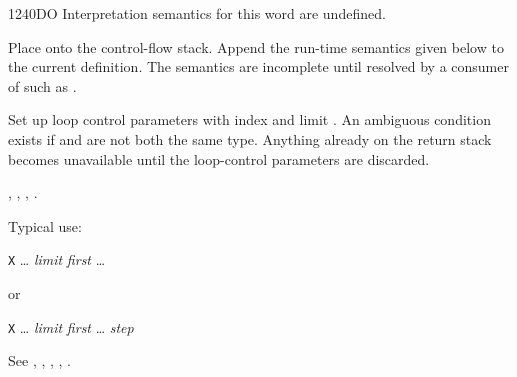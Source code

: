 \begin{worddef}{1240}{DO}
\interpret
	Interpretation semantics for this word are undefined.

\compile

	Place  onto the control-flow stack. Append the
	run-time semantics given below to the current definition. The
	semantics are incomplete until resolved by a consumer of
	 such as .

\runtime

	Set up loop control parameters with index  and
	limit . An ambiguous condition exists if
	 and  are not both the same
	type. Anything already on the return stack becomes unavailable
	until the loop-control parameters are discarded.

\see {},
	,
	,
	.

	\begin{rationale} %
		Typical use:

		\tab \word{:} \texttt{X} {\ldots}
			\emph{limit} \emph{first} 
				{\ldots}
		\word{;}

		or

		\tab \word{:} \texttt{X} {\ldots}
			\emph{limit} \emph{first} 
				{\ldots}
			\emph{step} 
		\word{;}
	\end{rationale}

	\begin{testing} %
		See ,
			,
			,
			,
			.
	\end{testing}
\end{worddef}

